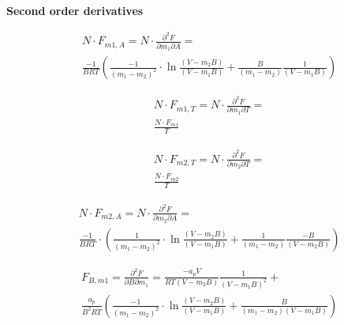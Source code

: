 \documentclass[a4paper, 12pt, english, sintefheadings, sintefcolour]{sintefmemo}
\begin{document}
\noindent\hrulefill\\

\textbf{Second order derivatives}\\

\noindent\hrulefill

\begin{equation}
\begin{split}
&N\cdot F_{m1, A}=N\cdot\frac{\partial^2 F}{\partial m_1 \partial A}= \\
&\frac{-1}{BRT}\left(\frac{-1}{(m_1-m_2)^2}\cdot\ln{\frac{(V-m_2B)}{(V-m_1B)}}+\frac{B}{(m_1-m_2)}\frac{1}{(V-m_1B)}\right)
\end{split}
\end{equation}

\begin{equation}
\begin{split}
&  N \cdot F_{m1,T} = N\cdot\frac{\partial^2 F}{\partial m_1 \partial T}= \\
&  \frac{N\cdot F_{m1}}{T}  
\end{split}
\end{equation}

\begin{equation}
\begin{split}
&  N \cdot F_{m2,T} = N\cdot\frac{\partial^2 F}{\partial m_2 \partial T}= \\
&  \frac{N\cdot F_{m2}}{T}  
\end{split}
\end{equation}

\noindent\hrulefill

\begin{equation}
\begin{split}
&N\cdot F_{m2, A}=N\cdot\frac{\partial^2 F}{\partial m_2 \partial A}=\\
&\frac{-1}{BRT}\cdot\left(\frac{1}{(m_1-m_2)^2}\cdot\ln{\frac{(V-m_2B)}{(V-m_1B)}}+\frac{1}{(m_1-m_2)}\frac{-B}{(V-m_2B)}\right)
\end{split}
\end{equation}

\noindent\hrulefill

\begin{equation}
\begin{split}
&F_{B,m1}=\frac{\partial^2 F}{\partial B \partial m_1}=\frac{-a_pV}{RT(V-m_2B)}\frac{1}{(V-m_1B)^2}+\\
&\frac{a_p}{B^2RT}\left(\frac{-1}{(m_1-m_2)^2}\cdot\ln{\frac{(V-m_2B)}{(V-m_1B)}}+\frac{B}{(m_1-m_2)(V-m_1B)}\right)
\end{split}
\end{equation}
\end{document}
